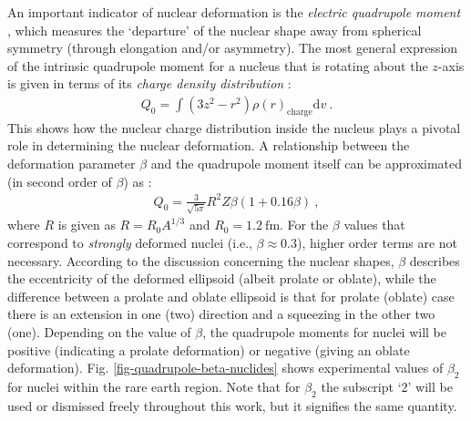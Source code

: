 An important indicator of nuclear deformation is the \emph{electric quadrupole moment} \cite{hamamoto2016interplay}, which measures the `departure' of the nuclear shape away from spherical symmetry (through elongation and/or asymmetry). The most general expression of the intrinsic quadrupole moment for a nucleus that is rotating about the $z$-axis is given in terms of its \emph{charge density distribution} \cite{casten2000nuclear}:
\begin{align}
    Q_0=\int(3z^2-r^2)\rho(r)_\text{charge}\text{d}v\ .
    \label{general-quadrupole-moment-Q0-charge}
\end{align}
This shows how the nuclear charge distribution inside the nucleus plays a pivotal role in determining the nuclear deformation. A relationship between the deformation parameter $\beta$ and the quadrupole moment itself can be approximated (in second order of $\beta$) as \cite{krane1991introductory}:
\begin{align}
    Q_0=\frac{3}{\sqrt{5\pi}}R^2Z\beta(1+0.16\beta)\ ,
    \label{quadrupole-moment-Q0}
\end{align}
where $R$ is given as $R=R_0A^{1/3}$ and $R_0=1.2\ \text{fm}$. For the $\beta$ values that correspond to \emph{strongly} deformed nuclei (i.e., $\beta\approx 0.3$), higher order terms are not necessary. According to the discussion concerning the nuclear shapes, $\beta$ describes the eccentricity of the deformed ellipsoid (albeit prolate or oblate), while the difference between a prolate and oblate ellipsoid is that for prolate (oblate) case there is an extension in one (two) direction and a squeezing in the other two (one). Depending on the value of $\beta$, the quadrupole moments for nuclei will be positive (indicating a prolate deformation) or negative (giving an oblate deformation). Fig. \ref{fig-quadrupole-beta-nuclides} shows experimental values of $\beta_2$ for nuclei within the rare earth region. Note that for $\beta_2$ the subscript `2' will be used or dismissed freely throughout this work, but it signifies the same quantity. 
